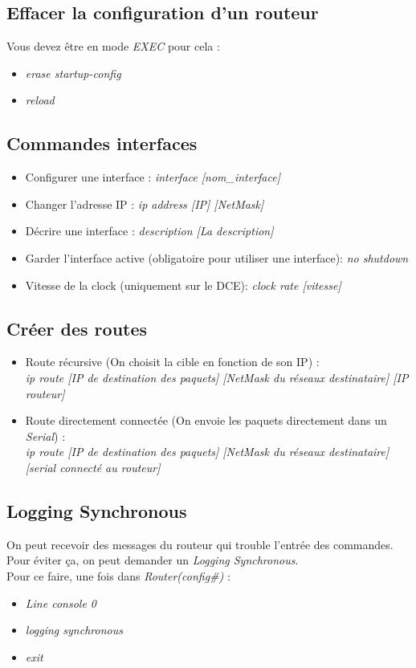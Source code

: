 \documentclass[a4paper]{article}
\begin{document}
\subsection{Effacer la configuration d'un routeur}
Vous devez être en mode \emph{EXEC} pour cela :
\begin{itemize}
  \item \emph{erase startup-config}
  \item \emph{reload}
\end{itemize}

\subsection{Commandes interfaces}
\begin{itemize}
  \item Configurer une interface : \emph{interface [nom\_interface]}
  \item Changer l'adresse IP : \emph{ip address [IP] [NetMask]}
  \item Décrire une interface : \emph{description [La description]}
  \item Garder l'interface active (obligatoire pour utiliser une interface): \emph{no shutdown}
  \item Vitesse de la clock (uniquement sur le DCE): \emph{clock rate [vitesse]}
\end{itemize}

\subsection{Créer des routes}
\begin{itemize}
  \item Route récursive (On choisit la cible en fonction de son IP) :\\ 
  \emph{ip route [IP de destination des paquets] [NetMask du réseaux destinataire] [IP routeur]}
  \item Route directement connectée (On envoie les paquets directement dans un \emph{Serial}) :\\ 
  \emph{ip route [IP de destination des paquets] [NetMask du réseaux destinataire] [serial connecté au routeur]}
\end{itemize}

\subsection{Logging Synchronous}
On peut recevoir des messages du routeur qui trouble l’entrée des commandes.
Pour éviter ça, on peut demander un \emph{Logging Synchronous}.\\
Pour ce faire, une fois dans \emph{Router(config\#)} :
\begin{itemize}
  \item \emph{Line console 0}
  \item \emph{logging synchronous}
  \item \emph{exit}
\end{itemize}
\end{document}
